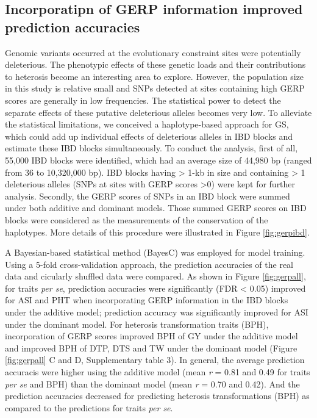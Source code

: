 \documentclass[9pt,twocolumn,twoside]{gsajnl}
\begin{document}
\subsection*{Incorporatipn of GERP information improved prediction accuracies}

Genomic variants occurred at the evolutionary constraint sites were potentially deleterious. The phenotypic effects of these genetic loads and their contributions to heterosis become an interesting area to explore. However, the population size in this study is relative small and SNPs detected at sites containing high GERP scores are generally in low frequencies. The statistical power to detect the separate effects of these putative deleterious alleles becomes very low. To alleviate the statistical limitations, we conceived a haplotype-based approach for GS, which could add up individual effects of deleterious alleles in IBD blocks and estimate these IBD blocks simultaneously. To conduct the analysis, first of all, 55,000 IBD blocks were identified, which had an average size of 44,980 bp (ranged from 36 to 10,320,000 bp). IBD blocks having > 1-kb in size and containing > 1 deleterious alleles (SNPs at sites with GERP scores >0) were kept for further analysis. Secondly, the GERP scores of SNPs in an IBD block were summed under both additive and dominant models. Those summed GERP scores on IBD blocks were considered as the measurements of the conservation of the haplotypes. More details of this procedure were illustrated in Figure \ref{fig:gerpibd}.      

A Bayesian-based statistical method (BayesC) \citep{habier2011extension} was employed for model training. Using a 5-fold cross-validation approach, the prediction accuracies of the real data and cicularly shuffled data were compared. As shown in Figure \ref{fig:gerpall}, for traits \emph{per se}, prediction accuracies were significantly (FDR < 0.05) improved for ASI and PHT when incorporating GERP information in the IBD blocks under the additive model; prediction accuracy was significantly improved for ASI under the dominant model. For heterosis transformation traits (BPH), incorporation of GERP scores improved BPH of GY under the additive model and improved BPH of DTP, DTS and TW under the dominant model (Figure \ref{fig:gerpall} C and D, Supplementary table 3). In general, the average prediction accuracis were higher using the additive model (mean \emph{r} = 0.81 and 0.49 for traits \emph{per se} and BPH) than the dominant model (mean \emph{r} = 0.70 and 0.42). And the prediction accuracies decreased for predicting heterosis transformations (BPH) as compared to the predictions for traits \emph{per se}.
\end{document}
